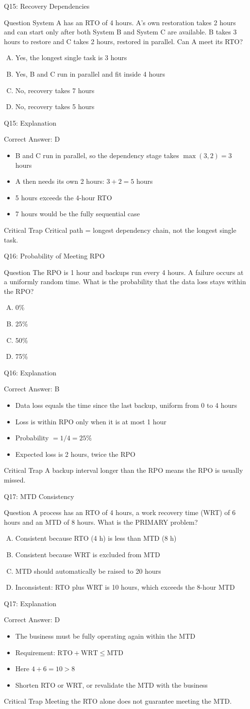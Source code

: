 \documentclass[aspectratio=169]{beamer}
\newcommand{\hq}[7]{%
  \begin{frame}{Q#1: #2}
    \begin{block}{Question}
      #3
    \end{block}
    \begin{enumerate}[(A)]
      #4
    \end{enumerate}
  \end{frame}
  \begin{frame}{Q#1: Explanation}
    \begin{block}{Correct Answer: #5}
      \begin{itemize}
        #6
      \end{itemize}
    \end{block}
    \begin{alertblock}{Critical Trap}
      #7
    \end{alertblock}
  \end{frame}
}
\begin{document}
\hq{15}{Recovery Dependencies}
{System A has an RTO of 4 hours. A's own restoration takes 2 hours and can start only after both System B and System C are available. B takes 3 hours to restore and C takes 2 hours, restored in parallel. Can A meet its RTO?}
{\item Yes, the longest single task is 3 hours
 \item Yes, B and C run in parallel and fit inside 4 hours
 \item No, recovery takes 7 hours
 \item No, recovery takes 5 hours}
{D}
{\item B and C run in parallel, so the dependency stage takes $\max(3, 2) = 3$ hours
 \item A then needs its own 2 hours: $3 + 2 = 5$ hours
 \item 5 hours exceeds the 4-hour RTO
 \item 7 hours would be the fully sequential case}
{Critical path = longest dependency chain, not the longest single task.}

\hq{16}{Probability of Meeting RPO}
{The RPO is 1 hour and backups run every 4 hours. A failure occurs at a uniformly random time. What is the probability that the data loss stays within the RPO?}
{\item 0\%
 \item 25\%
 \item 50\%
 \item 75\%}
{B}
{\item Data loss equals the time since the last backup, uniform from 0 to 4 hours
 \item Loss is within RPO only when it is at most 1 hour
 \item Probability $= 1/4 = 25\%$
 \item Expected loss is 2 hours, twice the RPO}
{A backup interval longer than the RPO means the RPO is usually missed.}

\hq{17}{MTD Consistency}
{A process has an RTO of 4 hours, a work recovery time (WRT) of 6 hours and an MTD of 8 hours. What is the PRIMARY problem?}
{\item Consistent because RTO (4 h) is less than MTD (8 h)
 \item Consistent because WRT is excluded from MTD
 \item MTD should automatically be raised to 20 hours
 \item Inconsistent: RTO plus WRT is 10 hours, which exceeds the 8-hour MTD}
{D}
{\item The business must be fully operating again within the MTD
 \item Requirement: $\text{RTO} + \text{WRT} \leq \text{MTD}$
 \item Here $4 + 6 = 10 > 8$
 \item Shorten RTO or WRT, or revalidate the MTD with the business}
{Meeting the RTO alone does not guarantee meeting the MTD.}
\end{document}

